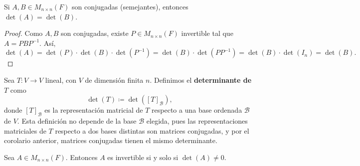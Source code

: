 \documentclass[12pt,a4paper]{book}
\begin{document}
    \begin{corolario}
        Si $A, B \in M_{n \times n}(F)$ son conjugadas (semejantes), entonces $\det(A) = \det(B)$.
    \end{corolario}

    \begin{proof}
        Como $A, B$ son conjugadas, existe $P \in M_{n \times n}(F)$ invertible tal que $A = PBP^{-1}$. Así,
        \begin{equation*}
            \det(A) = \det(P) \cdot \det(B) \cdot \det(P^{-1}) = \det(B) \cdot \det(PP^{-1}) = \det(B) \cdot \det(I_n) = \det(B).
        \end{equation*}
    \end{proof}

    \begin{definicion}
        Sea $T: V \to V$ lineal, con $V$ de dimensión finita $n$. Definimos el \textbf{determinante de $T$} como
        \begin{equation*}
            \det(T) \coloneqq \det([T]_\mathcal{B}),
        \end{equation*}
        donde $[T]_\mathcal{B}$ es la representación matricial de $T$ respecto a una base ordenada $\mathcal{B}$ de $V$. Esta definición no depende de la base $\mathcal{B}$ elegida, pues las representaciones matriciales de $T$ respecto a dos bases distintas son matrices conjugadas, y por el corolario anterior, matrices conjugadas tienen el mismo determinante.
    \end{definicion}

    \begin{teorema}
        Sea $A \in M_{n \times n}(F)$. Entonces $A$ es invertible si y solo si $\det(A) \neq 0$.
    \end{teorema}
\end{document}
